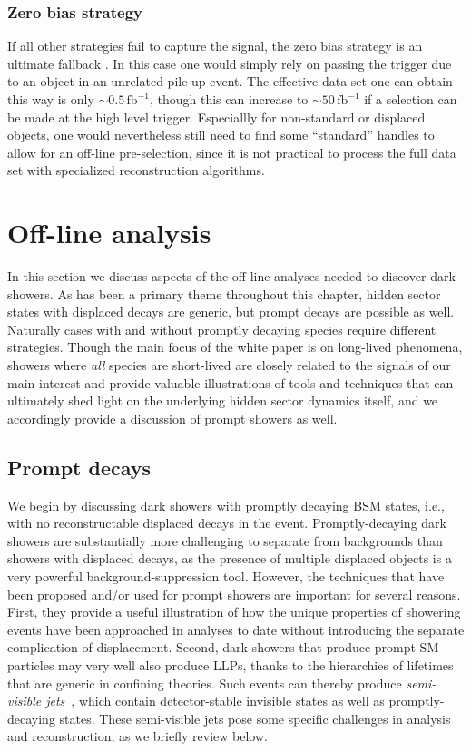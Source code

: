 \subsubsection{Zero bias strategy}
If all other strategies fail to capture the signal, the zero bias strategy is an ultimate fallback \cite{Nachman:2016nes}. In this case one would simply rely on passing the trigger due to an object in an unrelated pile-up event. The effective data set one can obtain this way is only $\sim0.5\,\text{fb}^{-1}$, though this can increase to $\sim50\,\text{fb}^{-1}$ if a selection can be made at the high level trigger. Especiallly for non-standard or displaced objects, one would nevertheless still need to find some ``standard'' handles to allow for an off-line pre-selection, since it is not practical to process the full data set with specialized reconstruction algorithms.

\section{Off-line analysis}
\label{sec:darkshowerreco}

In this section we discuss aspects of the off-line analyses needed to discover dark showers. As has been a primary theme throughout this chapter, hidden sector states with displaced decays are generic, but prompt decays are possible as well. Naturally cases with and without promptly decaying species require different strategies. Though the main focus of the white paper is on long-lived phenomena, showers where {\it all} species are short-lived are  closely related to the signals of our main interest and provide valuable illustrations of  tools and techniques that can ultimately shed light on the underlying hidden sector dynamics itself, and we accordingly provide a discussion of prompt showers as well.

\subsection{Prompt decays}
\label{sec:darkshowerprompt}

 We begin by discussing dark showers with promptly decaying BSM states, i.e., with no reconstructable displaced decays in the event.  Promptly-decaying dark showers are substantially more challenging to separate from backgrounds than showers with displaced decays, as the presence of multiple displaced objects is a very powerful background-suppression tool.  However, the techniques that have been proposed and/or used for prompt showers are important for several reasons. First, they provide a useful illustration of how the unique properties of showering events have been approached in analyses to date without introducing the separate complication of displacement.  Second, dark showers that produce prompt SM particles may very well also produce LLPs, thanks to the hierarchies of lifetimes that are generic in confining theories.  Such events can thereby produce {\em semi-visible jets}~\cite{Cohen:2015toa}, which contain detector-stable invisible states as well as promptly-decaying states.  These semi-visible jets pose some specific challenges in analysis and reconstruction, as we briefly review below. 

